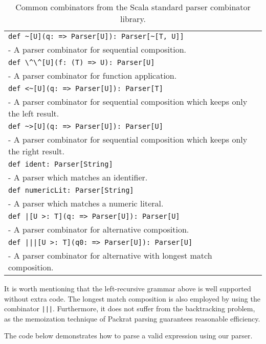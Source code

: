\begin{table}
\begin{tabularx}{\linewidth}{X}
\hline
\lstinline{def ~[U](q: => Parser[U]): Parser[~[T, U]]} \\
- A parser combinator for sequential composition. \\ \hline
\lstinline{def \^\^[U](f: (T) => U): Parser[U]} \\
- A parser combinator for function application. \\ \hline
\lstinline{def <~[U](q: => Parser[U]): Parser[T]} \\
- A parser combinator for sequential composition which keeps only the left result. \\ \hline
\lstinline{def ~>[U](q: => Parser[U]): Parser[U]} \\
- A parser combinator for sequential composition which keeps only the right result. \\ \hline
\lstinline{def ident: Parser[String]} \\
- A parser which matches an identifier. \\ \hline
\lstinline{def numericLit: Parser[String]} \\
- A parser which matches a numeric literal. \\ \hline
\lstinline{def |[U >: T](q: => Parser[U]): Parser[U]} \\
- A parser combinator for alternative composition. \\ \hline
\lstinline{def |||[U >: T](q0: => Parser[U]): Parser[U]} \\
- A parser combinator for alternative with longest match composition. \\ \hline
\end{tabularx}
\caption{Common combinators from the Scala standard parser combinator library.}\label{tab:packrat}
\end{table}

It is worth mentioning that the left-recursive grammar above is well supported without extra code.
 The longest match composition is also employed by using the combinator \lstinline{|||}. Furthermore, it does not suffer from the backtracking problem, as the memoization technique of Packrat parsing guarantees reasonable efficiency.

The code below demonstrates how to parse a valid expression  using our parser.


